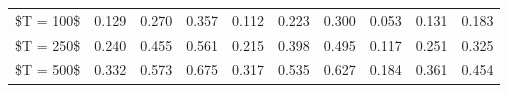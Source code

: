 % 
\begin{tabular}{cccccccccc}
  \hline
  \hline
\$T = 100\$ & 0.129 & 0.270 & 0.357 & 0.112 & 0.223 & 0.300 & 0.053 & 0.131 & 0.183 \\ 
  \$T = 250\$ & 0.240 & 0.455 & 0.561 & 0.215 & 0.398 & 0.495 & 0.117 & 0.251 & 0.325 \\ 
  \$T = 500\$ & 0.332 & 0.573 & 0.675 & 0.317 & 0.535 & 0.627 & 0.184 & 0.361 & 0.454 \\ 
   \hline
\end{tabular}

